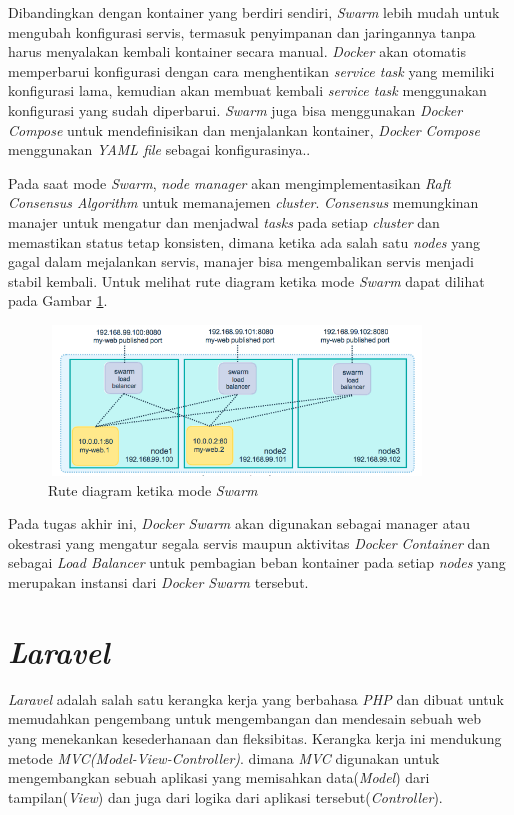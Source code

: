 			\indent Dibandingkan dengan kontainer yang berdiri sendiri, \textit{Swarm} lebih mudah untuk mengubah konfigurasi servis, termasuk penyimpanan dan jaringannya tanpa harus menyalakan kembali kontainer secara manual. \textit{Docker} akan otomatis memperbarui konfigurasi dengan cara menghentikan \textit{service task} yang memiliki konfigurasi lama, kemudian akan membuat kembali \textit{service task} menggunakan konfigurasi yang sudah diperbarui. \textit{Swarm} juga bisa menggunakan \textit{Docker Compose} untuk mendefinisikan dan menjalankan kontainer, \textit{Docker Compose} menggunakan \textit{YAML file} sebagai konfigurasinya.\cite{docker_swarm}.
			
			\indent Pada saat mode \textit{Swarm}, \textit{node manager} akan mengimplementasikan \textit{Raft Consensus Algorithm} untuk memanajemen \textit{cluster}. \textit{Consensus} memungkinan manajer untuk mengatur dan menjadwal \textit{tasks} pada setiap \textit{cluster} dan memastikan status tetap konsisten, dimana ketika ada salah satu \textit{nodes} yang gagal dalam mejalankan servis, manajer bisa mengembalikan servis menjadi stabil kembali\cite{docker_swarm_raft}. Untuk melihat rute diagram ketika mode \textit{Swarm} dapat dilihat pada Gambar \ref{swarmdiagramroute}.
			
			\begin{figure}[H]
				\centering
				\includegraphics[width=10cm,height=4cm]{Images/C-2/swarmdiagramroute.png}
				\caption{Rute diagram ketika mode \textit{Swarm}\cite{docker_swarm_route}}
				\label{swarmdiagramroute}
			\end{figure}
		
			\indent Pada tugas akhir ini, \textit{Docker Swarm} akan digunakan sebagai manager atau okestrasi yang mengatur segala servis maupun aktivitas \textit{Docker Container} dan sebagai \textit{Load Balancer} untuk pembagian beban kontainer pada setiap \textit{nodes} yang merupakan instansi dari \textit{Docker Swarm} tersebut.
			
			
		
	\section{\textit{Laravel}}
		\textit{Laravel} adalah salah satu kerangka kerja yang berbahasa \textit{PHP} dan dibuat untuk memudahkan pengembang untuk mengembangan dan mendesain sebuah web yang menekankan kesederhanaan dan fleksibitas. Kerangka kerja ini mendukung metode \textit{MVC(Model-View-Controller)}. dimana \textit{MVC} digunakan untuk mengembangkan sebuah aplikasi yang memisahkan data(\textit{Model}) dari tampilan(\textit{View}) dan juga dari logika dari aplikasi tersebut(\textit{Controller})\cite{laraveframework}.
		
